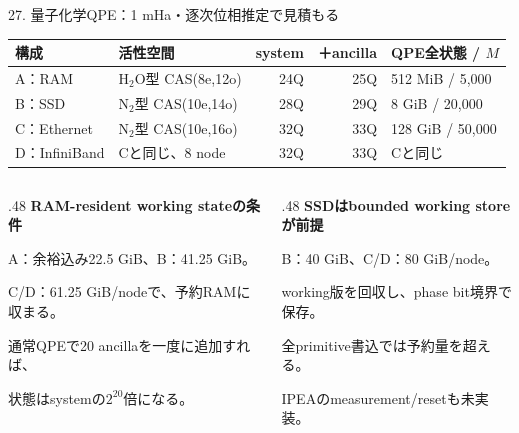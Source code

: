 \begin{frame}{27. 量子化学QPE：1 mHa・逐次位相推定で見積もる}
  \small
  \begin{tabularx}{\textwidth}{@{}p{}p{}rrX@{}}
    \toprule 構成 & 活性空間 & system & ＋ancilla & QPE全状態 / $M$ \\
    \midrule
    A：RAM & H$_2$O型 CAS(8e,12o) & 24Q & 25Q & 512 MiB / 5,000 \\
    B：SSD & N$_2$型 CAS(10e,14o) & 28Q & 29Q & 8 GiB / 20,000 \\
    C：Ethernet & N$_2$型 CAS(10e,16o) & 32Q & 33Q & 128 GiB / 50,000 \\
    D：InfiniBand & Cと同じ、8 node & 32Q & 33Q & Cと同じ \\
    \bottomrule
  \end{tabularx}
  \medskip
  \begin{columns}[T,onlytextwidth]
    \begin{column}{.48\textwidth}
      \textbf{RAM-resident working stateの条件}\par
      \small A：余裕込み22.5 GiB、B：41.25 GiB。\par
      C/D：61.25 GiB/nodeで、予約RAMに収まる。\par
      通常QPEで20 ancillaを一度に追加すれば、\par
      状態はsystemの$2^{20}$倍になる。
    \end{column}
    \begin{column}{.48\textwidth}
      \textbf{SSDはbounded working storeが前提}\par
      \small B：40 GiB、C/D：80 GiB/node。\par
      working版を回収し、phase bit境界で保存。\par
      \alert{全primitive書込では予約量を超える。}\par
      IPEAのmeasurement/resetも未実装。
    \end{column}
  \end{columns}
\end{frame}

